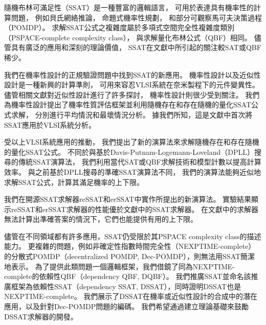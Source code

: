 
隨機布林可滿足性（SSAT）是一種豐富的邏輯語言，
可用於表達具有機率性的計算問題，
例如貝氏網絡推論，
命題式機率性規劃，
和部分可觀察馬可夫決策過程（POMDP）。
求解SSAT公式之複雜度屬於多項式空間完全性複雜度類別（PSPACE-complete complexity class），
與求解量化布林公式（QBF）相同。
儘管具有廣泛的應用和深刻的理論價值，
SSAT在文獻中所引起的關注較SAT或QBF稀少。

我們在機率性設計的正規驗證問題中找到SSAT的新應用。
機率性設計以及近似性設計是一種新興的計算準則，
可用來容忍VLSI系統在奈米製程下的元件變異性。
儘管相關文獻對近似性設計進行了許多探討，
機率性設計則很少受到關注。
我們為機率性設計提出了機率性質評估框架並利用隨機存在和存在隨機的量化SSAT公式求解，
分別進行平均情況和最壞情況分析。
據我們所知，這是文獻中首次將SSAT應用於VLSI系統分析。

受以上VLSI系統應用的推動，
我們提出了新的演算法來求解隨機存在和存在隨機的量化SSAT公式。
不同於與基於Davis-Putnam-Logemann-Loveland（DPLL）搜尋的傳統SSAT演算法，
我們利用當代SAT或QBF求解技術和模型計數以提高計算效率。
與之前基於DPLL搜尋的準確SSAT演算法不同，
我們的演算法能夠近似地求解SSAT公式，計算其滿足機率的上下限。

我們在開源SSAT求解器reSSAT和erSSAT中實作所提出的新演算法。
實驗結果顯示reSSAT和erSSAT求解器的性能優於文獻中的SSAT求解器。
在文獻中的求解器無法計算出準確答案的情況下，它們也能提供有用的上下限。

儘管在不同領域都有許多應用，SSAT仍受限於其PSPACE complexity class的描述能力。
更複雜的問題，例如非確定性指數時間完全性（NEXPTIME-complete）的分散式POMDP（decentralized POMDP, Dec-POMDP），則無法用SSAT簡潔地表示。
為了提供此類問題一個邏輯框架，我們借鏡了同為NEXPTIME-complete的依賴性QBF（dependency QBF, DQBF）。
我們推廣SSAT並命名該推廣框架為依賴性SSAT（dependency SSAT, DSSAT），同時證明DSSAT也是NEXPTIME-complete。
我們展示了DSSAT在機率或近似性設計的合成中的潛在應用，以及針對Dec-POMDP問題的編碼。
我們希望通過建立理論基礎來鼓勵DSSAT求解器的開發。